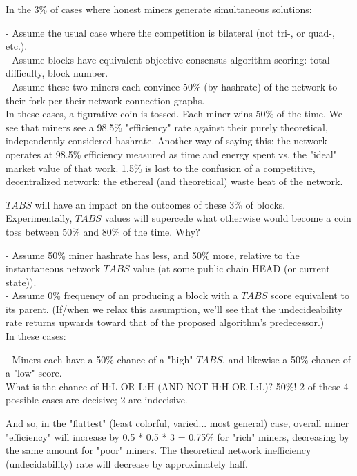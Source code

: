 \documentclass[11pt]{article}
\theoremstyle{plain}
\begin{document}
In the 3\% of cases where honest miners generate simultaneous solutions:

- Assume the usual case where the competition is bilateral (not tri-, or quad-,
etc.). \\
- Assume blocks have equivalent objective consensus-algorithm scoring: total
difficulty, block number. \\
- Assume these two miners each convince 50\% (by hashrate) of the network to
their fork per their network connection graphs. \\

In these cases, a figurative coin is tossed. Each miner wins 50\% of the time.
We see that miners see a 98.5\% "efficiency" rate against their purely
theoretical, independently-considered hashrate.
Another way of saying this: the network operates at 98.5\% efficiency measured
as time and energy spent vs. the "ideal" market value of that work.
1.5\% is lost to the confusion of a competitive, decentralized network; the
ethereal (and theoretical) waste heat of the network.

$TABS$ will have an impact on the outcomes of these 3\% of blocks.
Experimentally, $TABS$ values will supercede what otherwise would become a coin
toss between 50\% and 80\% of the time.
Why?

- Assume 50\% miner hashrate has less, and 50\% more, relative to the
instantaneous network $TABS$ value (at some public chain HEAD (or current
state)). \\
- Assume 0\% frequency of an producing a block with a $TABS$ score equivalent
to its parent. (If/when we relax this assumption, we'll see that the
undecideability rate returns upwards toward that of the proposed algorithm's
predecessor.) \\

In these cases:

- Miners each have a 50\% chance of a "high" $TABS$, and likewise a 50\% chance
of a "low" score. \\

What is the chance of H:L OR L:H (AND NOT H:H OR L:L)? 50\%! 2 of these 4
possible cases are decisive; 2 are indecisive.

And so, in the "flattest" (least colorful, varied... most general) case,
overall miner "efficiency" will increase by 0.5 * 0.5 * 3 = 0.75\% for "rich"
miners, decreasing by the same amount for "poor" miners.
The theoretical network inefficiency (undecidability) rate will decrease by
approximately half.
\end{document}
